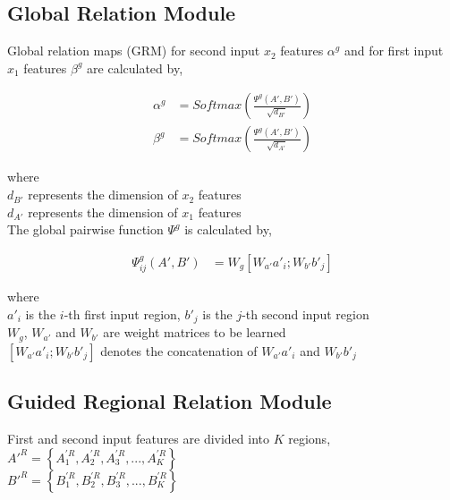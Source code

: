 \documentclass{article}
\begin{document}
\subsection{Global Relation Module}

\noindent Global relation maps (GRM) for second input $x_{2}$ features $\alpha^{g}$ and for first input $x_{1}$ features $\beta^{g}$ are calculated by,

\begin{align}
\alpha^{g} &= Softmax\left(\frac{\Psi^{g}(A', B')}{\sqrt{d_{B'}}}\right) \\
\beta^{g} &= Softmax\left(\frac{\Psi^{g}(A', B')}{\sqrt{d_{A'}}}\right)
\end{align}

where \\

\indent\indent $d_{B'}$ represents the dimension of $x_{2}$ features \\
\indent\indent $d_{A'}$ represents the dimension of $x_{1}$ features \\

\noindent The global pairwise function $\Psi^{g}$ is calculated by,

\begin{align}
\Psi_{ij}^{g}(A', B') &= W_{g}[W_{a'}a'_{i}; W_{b'}b'_{j}] 
\end{align}

where \\

\indent\indent $a'_{i}$ is the $i$-th first input region, $b'_{j}$ is the $j$-th second input region \\ 
\indent\indent $W_{g}$, $W_{a'}$ and $W_{b'}$ are weight matrices to be learned \\ 
\indent\indent $[W_{a'}a'_{i}; W_{b'}b'_{j}]$ denotes the concatenation of $W_{a'}a'_{i}$ and $W_{b'}b'_{j}$ \\

\subsection{Guided Regional Relation Module}

\noindent First and second input features are divided into $K$ regions, \\

\indent\indent $A'^{R} = \left\{A_{1}^{'R}, A_{2}^{'R}, A_{3}^{'R}, ..., A_{K}^{'R}\right\}$ \\ 
\indent\indent $B'^{R} = \left\{B_{1}^{'R}, B_{2}^{'R}, B_{3}^{'R}, ..., B_{K}^{'R}\right\}$ \\ 
\end{document}
